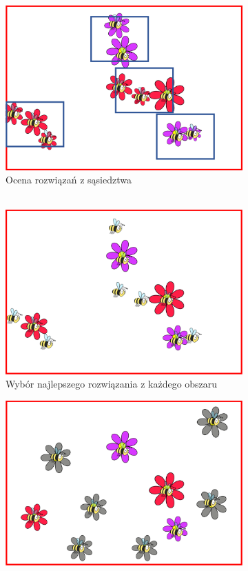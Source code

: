 \begin{figure} [htbp]
\begin{subfigure}[b]{0.32\textwidth}
    \includegraphics[width=\linewidth]{figures/rojowe/etap6.png}
    \caption{Ocena rozwiązań z sąsiedztwa\\~}
    \end{subfigure}
    \begin{subfigure}[b]{0.32\textwidth}
    \includegraphics[width=\linewidth]{figures/rojowe/etap7.png}
    \caption{Wybór najlepszego rozwiązania z każdego obszaru}
    \end{subfigure}
    \begin{subfigure}[b]{0.32\textwidth}
    \includegraphics[width=\linewidth]{figures/rojowe/etap8.png}

\end{subfigure}
\end{figure}
